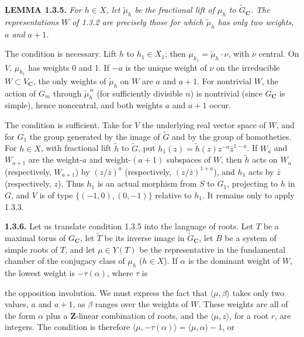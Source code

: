 \documentclass[10pt,a4paper]{article}
\newcommand{\SourcePage}[2]{\clearpage\setcounter{page}{#2}\typeout{D031_SOURCE_PAGE physical=#1 printed=#2}}
\begin{document}
\textbf{LEMMA 1.3.5.} \emph{For \(h\in X\), let \(\widetilde\mu_h\) be the fractional lift of \(\mu_h\) to \(\widetilde G_{\mathbf C}\). The representations \(W\) of 1.3.2 are precisely those for which \(\widetilde\mu_h\) has only two weights, \(a\) and \(a+1\).}

The condition is necessary. Lift \(h\) to \(h_1\in X_1\); then \(\mu_{h_1}=\widetilde\mu_h\cdot\nu\), with \(\nu\) central. On \(V\), \(\mu_{h_1}\) has weights 0 and 1. If \(-a\) is the unique weight of \(\nu\) on the irreducible \(W\subset V_{\mathbf C}\), the only weights of \(\widetilde\mu_h\) on \(W\) are \(a\) and \(a+1\). For nontrivial \(W\), the action of \(G_m\) through \(\widetilde\mu_h^{\,n}\) (for sufficiently divisible \(n\)) is nontrivial (since \(G_{\mathbf C}\) is simple), hence noncentral, and both weights \(a\) and \(a+1\) occur.

The condition is sufficient. Take for \(V\) the underlying real vector space of \(W\), and for \(G_1\) the group generated by the image of \(\widetilde G\) and by the group of homotheties. For \(h\in X\), with fractional lift \(\widetilde h\) to \(\widetilde G\), put \(h_1(z)=\widetilde h(z)z^{-a}\bar z^{1-a}\). If \(W_a\) and \(W_{a+1}\) are the weight-\(a\) and weight-\((a+1)\) subspaces of \(W\), then \(\widetilde h\) acts on \(W_a\) (respectively, \(W_{a+1}\)) by \((z/\bar z)^a\) (respectively, \((z/\bar z)^{1+a}\)), and \(h_1\) acts by \(\bar z\) (respectively, \(z\)). Thus \(h_1\) is an actual morphism from \(S\) to \(G_1\), projecting to \(h\) in \(G\), and \(V\) is of type \(\{(-1,0),(0,-1)\}\) relative to \(h_1\). It remains only to apply 1.3.3.

\textbf{1.3.6.} Let us translate condition 1.3.5 into the language of roots. Let \(T\) be a maximal torus of \(G_{\mathbf C}\), let \(\widetilde T\) be its inverse image in \(\widetilde G_{\mathbf C}\), let \(B\) be a system of simple roots of \(T\), and let \(\mu\in Y(T)\) be the representative in the fundamental chamber of the conjugacy class of \(\mu_h\) (\(h\in X\)). If \(\alpha\) is the dominant weight of \(W\), the lowest weight is \(-\tau(\alpha)\), where \(\tau\) is

\SourcePage{15}{261}
the opposition involution. We must express the fact that \(\langle\mu,\beta\rangle\) takes only two values, \(a\) and \(a+1\), as \(\beta\) ranges over the weights of \(W\). These weights are all of the form \(\alpha\) plus a \(\mathbf Z\)-linear combination of roots, and the \(\langle\mu,z\rangle\), for a root \(r\), are integers. The condition is therefore \(\langle\mu,-\tau(\alpha)\rangle=\langle\mu,\alpha\rangle-1\), or
\end{document}
